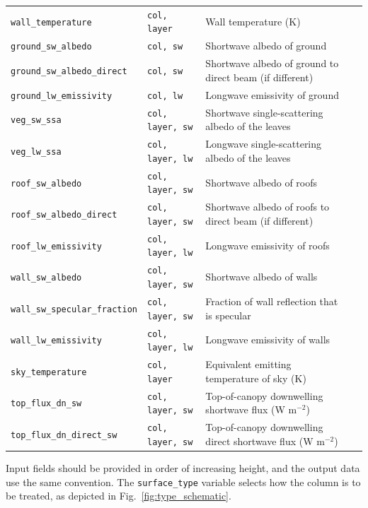 \documentclass[a4,oneside]{article}
\def\codesize{\small}
\def\codetabsize{\footnotesize}
\def\code#1{{\codesize\texttt{#1}}}
\def\codetab#1{{\codetabsize\texttt{#1}}}
\begin{document}
\begin{center}
\begin{longtable}{llLp{8cm}}
\codetab{wall\_temperature} & \codetab{col, layer} & Wall temperature (K) \\
%
\codetab{ground\_sw\_albedo} & \codetab{col, sw} & Shortwave albedo of ground \\
\codetab{ground\_sw\_albedo\_direct} & \codetab{col, sw} & Shortwave albedo of ground to direct beam (if different)\\
\codetab{ground\_lw\_emissivity} & \codetab{col, lw} & Longwave emissivity of ground \\
%
\codetab{veg\_sw\_ssa} & \codetab{col, layer, sw} & Shortwave single-scattering albedo of the leaves \\
\codetab{veg\_lw\_ssa} & \codetab{col, layer, lw} & Longwave single-scattering albedo of the leaves \\
%
\codetab{roof\_sw\_albedo} & \codetab{col, layer, sw} & Shortwave albedo of roofs \\
\codetab{roof\_sw\_albedo\_direct} & \codetab{col, layer, sw} & Shortwave albedo of roofs to direct beam (if different)\\
\codetab{roof\_lw\_emissivity} & \codetab{col, layer, lw} & Longwave emissivity of roofs \\
%
\codetab{wall\_sw\_albedo} & \codetab{col, layer, sw} & Shortwave albedo of walls \\
\codetab{wall\_sw\_specular\_fraction} & \codetab{col, layer, sw} & Fraction of wall reflection that is specular \\
\codetab{wall\_lw\_emissivity} & \codetab{col, layer, lw} & Longwave emissivity of walls \\
%
\codetab{sky\_temperature} & \codetab{col, layer} & Equivalent emitting temperature of sky (K) \\
\codetab{top\_flux\_dn\_sw} & \codetab{col, layer, sw} & Top-of-canopy downwelling shortwave flux (W m$^{-2}$) \\
\codetab{top\_flux\_dn\_direct\_sw} & \codetab{col, layer, sw} & Top-of-canopy downwelling direct shortwave flux (W m$^{-2}$) \\
\hline
\end{longtable}
\end{center}

Input fields should be provided in order of increasing height, and the
output data use the same convention. The \code{surface\_type} variable
selects how the column is to be treated, as depicted in
Fig.\ \ref{fig:type_schematic}.
\end{document}
